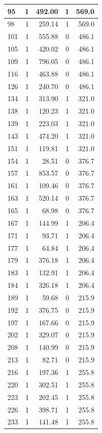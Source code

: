 \documentclass[
  12pt,
]{book}
\begin{document}
\begin{tabular}{l|r|r|r|r}
\hline
95 & 1 & 492.00 & 1 & 569.0\\
\hline
98 & 1 & 259.14 & 1 & 569.0\\
\hline
101 & 1 & 555.88 & 0 & 486.1\\
\hline
105 & 1 & 420.02 & 0 & 486.1\\
\hline
109 & 1 & 796.05 & 0 & 486.1\\
\hline
116 & 1 & 463.88 & 0 & 486.1\\
\hline
126 & 1 & 240.70 & 0 & 486.1\\
\hline
134 & 1 & 313.90 & 1 & 321.0\\
\hline
138 & 1 & 120.23 & 1 & 321.0\\
\hline
139 & 1 & 223.03 & 1 & 321.0\\
\hline
143 & 1 & 474.20 & 1 & 321.0\\
\hline
151 & 1 & 119.81 & 1 & 321.0\\
\hline
154 & 1 & 28.51 & 0 & 376.7\\
\hline
157 & 1 & 853.57 & 0 & 376.7\\
\hline
161 & 1 & 109.46 & 0 & 376.7\\
\hline
163 & 1 & 520.14 & 0 & 376.7\\
\hline
165 & 1 & 68.98 & 0 & 376.7\\
\hline
167 & 1 & 144.99 & 1 & 206.4\\
\hline
171 & 1 & 93.71 & 1 & 206.4\\
\hline
177 & 1 & 64.84 & 1 & 206.4\\
\hline
179 & 1 & 376.18 & 1 & 206.4\\
\hline
183 & 1 & 132.91 & 1 & 206.4\\
\hline
184 & 1 & 326.18 & 1 & 206.4\\
\hline
189 & 1 & 59.68 & 0 & 215.9\\
\hline
192 & 1 & 376.75 & 0 & 215.9\\
\hline
197 & 1 & 167.66 & 0 & 215.9\\
\hline
202 & 1 & 329.07 & 0 & 215.9\\
\hline
208 & 1 & 140.99 & 0 & 215.9\\
\hline
213 & 1 & 82.71 & 0 & 215.9\\
\hline
216 & 1 & 197.36 & 1 & 255.8\\
\hline
220 & 1 & 302.51 & 1 & 255.8\\
\hline
223 & 1 & 202.45 & 1 & 255.8\\
\hline
226 & 1 & 398.71 & 1 & 255.8\\
\hline
233 & 1 & 141.48 & 1 & 255.8\\

\end{tabular}
\end{document}
